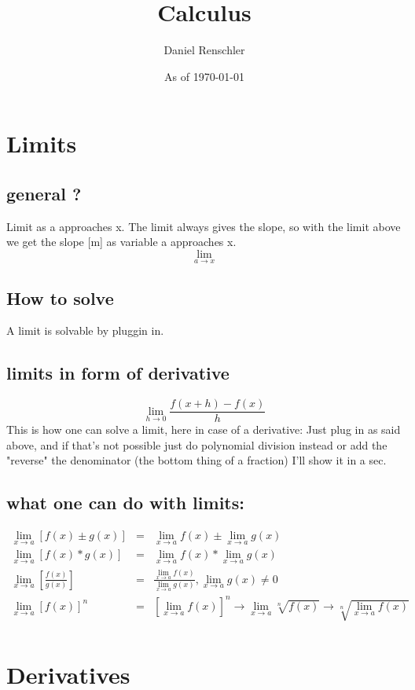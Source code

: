\documentclass[a4paper, 12p]{report}
\begin{document}
\title{Calculus}
\author{Daniel Renschler}
\date{As of \today}
\maketitle


\section{Limits}
\subsection{general ?}
Limit as a approaches x.
The limit always gives the slope, so with the limit above we get the slope [m] as variable a approaches x.
\[\lim_{a \to x}\]
\subsection{How to solve}
A limit is solvable by pluggin in.
\subsection{limits in form of derivative}
\[ \lim_{h \rightarrow 0} \frac{f(x+h)-f(x)}{h} \]
This is how one can solve a limit, here in case of a derivative:
Just plug in as said above, and if that's not possible just do polynomial division instead or add the "reverse" the denominator (the bottom thing of a fraction) I'll show it in a sec.
\subsection{what one can do with limits:}
\begin{eqnarray*}
    \lim_{x \to a}\left[f(x)±g(x)\right] &=& \lim_{x \to a}f(x)±\lim_{x \to a}g(x)\\
    \lim_{x \to a}\left[f(x)*g(x)\right]&=&\lim_{x \to a}f(x)*\lim_{x \to a}g(x) \\
    \lim_{x \to a}\left[\frac{f(x)}{g(x)}\right] &=& \frac{\lim_{x \to a}f(x)}{\lim_{x \to a}g(x)}, \lim_{x \to a}g(x) \neq 0 \\
    \lim_{x \to a}\left[f(x)\right]^n &=& \left[\lim_{x \to a}f(x)\right]^n \to  \lim_{x \to a} \sqrt[n]{f(x)} \to \sqrt[n]{\lim_{x \to a}f(x)}    \\
\end{eqnarray*}



\section{Derivatives}
\end{document}
